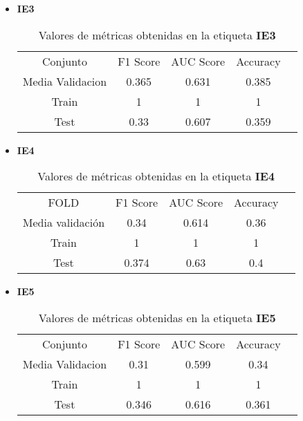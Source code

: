 \begin{itemize}
	\item  \textbf{IE3}
	      \begin{table}[H]
		      \centering
		      \begin{tabular}{|c|c|c|c|c}
			      \cline{1-4}
			      Conjunto         & F1 Score & AUC Score & Accuracy \\ \cline{1-4}
			      Media Validacion & 0.365    & 0.631     & 0.385    \\ \cline{1-4}
			      Train            & 1        & 1         & 1        \\ \cline{1-4}
			      Test             & 0.33     & 0.607     & 0.359    \\ \cline{1-4}
		      \end{tabular}
		      \caption{Valores de métricas obtenidas en la etiqueta \textbf{IE3}}
	      \end{table}
	\item  \textbf{IE4}
	      \begin{table}[H]
		      \centering
		      \begin{tabular}{|c|c|c|c|c}
			      \cline{1-4}
			      FOLD             & F1 Score & AUC Score & Accuracy \\ \cline{1-4}
			      Media validación & 0.34     & 0.614     & 0.36     \\ \cline{1-4}
			      Train            & 1        & 1         & 1        \\ \cline{1-4}
			      Test             & 0.374    & 0.63      & 0.4      \\ \cline{1-4}
		      \end{tabular}
		      \caption{Valores de métricas obtenidas en la etiqueta \textbf{IE4}}
	      \end{table}
	\item  \textbf{IE5}
	      \begin{table}[H]
		      \centering
		      \begin{tabular}{|c|c|c|c|c}
			      \cline{1-4}
			      Conjunto         & F1 Score & AUC Score & Accuracy \\ \cline{1-4}
			      Media Validacion & 0.31     & 0.599     & 0.34     \\ \cline{1-4}
			      Train            & 1        & 1         & 1        \\ \cline{1-4}
			      Test             & 0.346    & 0.616     & 0.361    \\ \cline{1-4}
		      \end{tabular}
		      \caption{Valores de métricas obtenidas en la etiqueta \textbf{IE5}}

\end{table}
\end{itemize}
